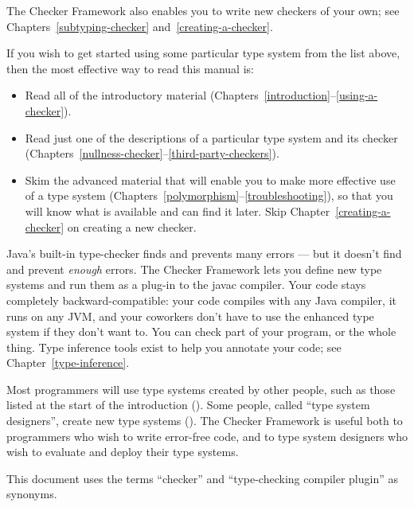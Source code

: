 The Checker Framework also enables you to write new checkers of your
own; see Chapters~\ref{subtyping-checker} and~\ref{creating-a-checker}.



If you wish to get started using some particular type system from the list
above, then the most effective way to read this manual is:

\begin{itemize}
\item
  Read all of the introductory material
  (Chapters~\ref{introduction}--\ref{using-a-checker}).
\item
  Read just one of the descriptions of a particular type system and its
  checker (Chapters~\ref{nullness-checker}--\ref{third-party-checkers}).
\item
  Skim the advanced material that will enable you to make more effective
  use of a type system
  (Chapters~\ref{polymorphism}--\ref{troubleshooting}), so that you will
  know what is available and can find it later.  Skip
  Chapter~\ref{creating-a-checker} on creating a new checker.
\end{itemize}



Java's built-in type-checker finds and prevents many errors --- but it
doesn't find and prevent \emph{enough} errors.  The Checker Framework lets you
define new type systems and run them as a plug-in to the javac compiler.  Your
code stays completely backward-compatible:  your code compiles with any
Java compiler, it runs on any JVM, and your coworkers don't have to use the
enhanced type system if they don't want to.  You can check part of
your program, or the whole thing.  Type inference tools exist to help you annotate your
code; see Chapter~\ref{type-inference}.

Most programmers will use type systems created by other people, such as
those listed at the start of the introduction ().
Some people, called ``type system designers'', create new type systems
().
The Checker Framework is useful both to programmers who
wish to write error-free code, and to type system designers who wish to
evaluate and deploy their type systems.

This document uses the terms ``checker'' and ``type-checking compiler
plugin'' as synonyms.

